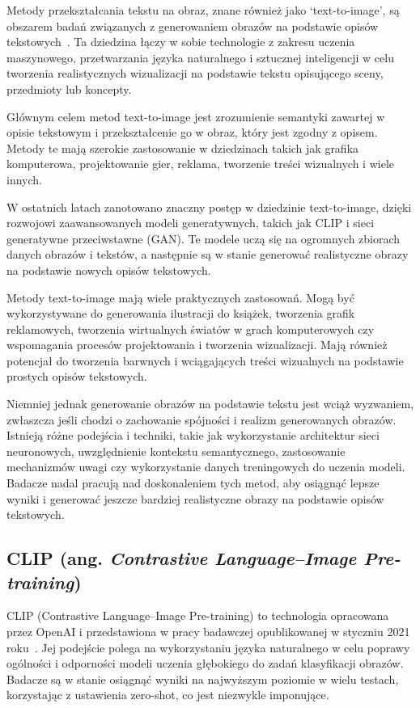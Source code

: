     Metody przekształcania tekstu na obraz, znane również jako `text-to-image', są obszarem badań związanych z generowaniem obrazów na podstawie opisów tekstowych~\cite{creativity_of_text_to_image}. Ta dziedzina łączy w sobie technologie z zakresu uczenia maszynowego, przetwarzania języka naturalnego i sztucznej inteligencji w celu tworzenia realistycznych wizualizacji na podstawie tekstu opisującego sceny, przedmioty lub koncepty.

    Głównym celem metod text-to-image jest zrozumienie semantyki zawartej w opisie tekstowym i przekształcenie go w obraz, który jest zgodny z opisem.
    Metody te mają szerokie zastosowanie w dziedzinach takich jak grafika komputerowa, projektowanie gier, reklama, tworzenie treści wizualnych i wiele innych.

    W ostatnich latach zanotowano znaczny postęp w dziedzinie text-to-image, dzięki rozwojowi zaawansowanych modeli generatywnych, takich jak CLIP i sieci generatywne przeciwstawne (GAN). Te modele uczą się na ogromnych zbiorach danych obrazów i tekstów, a następnie są w stanie generować realistyczne obrazy na podstawie nowych opisów tekstowych.

    Metody text-to-image mają wiele praktycznych zastosowań.
    Mogą być wykorzystywane do generowania ilustracji do książek, tworzenia grafik reklamowych, tworzenia wirtualnych światów w grach komputerowych czy wspomagania procesów projektowania i tworzenia wizualizacji. Mają również potencjał do tworzenia barwnych i wciągających treści wizualnych na podstawie prostych opisów tekstowych.

    Niemniej jednak generowanie obrazów na podstawie tekstu jest wciąż wyzwaniem, zwłaszcza jeśli chodzi o zachowanie spójności i realizm generowanych obrazów. Istnieją różne podejścia i techniki, takie jak wykorzystanie architektur sieci neuronowych, uwzględnienie kontekstu semantycznego, zastosowanie mechanizmów uwagi czy wykorzystanie danych treningowych do uczenia modeli. Badacze nadal pracują nad doskonaleniem tych metod, aby osiągnąć lepsze wyniki i generować jeszcze bardziej realistyczne obrazy na podstawie opisów tekstowych.

    \subsection{CLIP (ang.  \textit{Contrastive Language–Image Pre-training})}
    CLIP (Contrastive Language–Image Pre-training) to technologia opracowana przez OpenAI i przedstawiona w pracy badawczej opublikowanej w styczniu 2021 roku~\cite{CLIP}.
    Jej podejście polega na wykorzystaniu języka naturalnego w celu poprawy ogólności i odporności modeli uczenia głębokiego do zadań klasyfikacji obrazów. Badacze są w stanie osiągnąć wyniki na najwyższym poziomie w wielu testach, korzystając z ustawienia zero-shot, co jest niezwykle imponujące.

